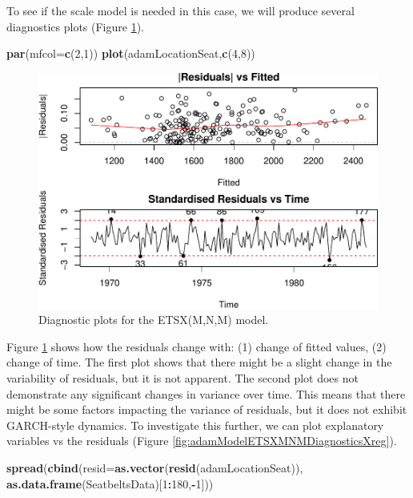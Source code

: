 \documentclass[]{book}
\newenvironment{Shaded}{\begin{snugshade}}{\end{snugshade}}
\newcommand{\DataTypeTok}[1]{\textcolor[rgb]{0.13,0.29,0.53}{#1}}
\newcommand{\DecValTok}[1]{\textcolor[rgb]{0.00,0.00,0.81}{#1}}
\newcommand{\KeywordTok}[1]{\textcolor[rgb]{0.13,0.29,0.53}{\textbf{#1}}}
\newcommand{\NormalTok}[1]{#1}
\newcommand{\OperatorTok}[1]{\textcolor[rgb]{0.81,0.36,0.00}{\textbf{#1}}}
\theoremstyle{definition}
\theoremstyle{definition}
\theoremstyle{definition}
\theoremstyle{definition}
\theoremstyle{remark}
\begin{document}
To see if the scale model is needed in this case, we will produce several diagnostics plots (Figure \ref{fig:adamModelETSXMNMDiagnostics48}).

\begin{Shaded}
\begin{Highlighting}[]
\KeywordTok{par}\NormalTok{(}\DataTypeTok{mfcol=}\KeywordTok{c}\NormalTok{(}\DecValTok{2}\NormalTok{,}\DecValTok{1}\NormalTok{))}
\KeywordTok{plot}\NormalTok{(adamLocationSeat,}\KeywordTok{c}\NormalTok{(}\DecValTok{4}\NormalTok{,}\DecValTok{8}\NormalTok{))}
\end{Highlighting}
\end{Shaded}

\begin{figure}
\centering
\includegraphics{Svetunkov--2022----ADAM_files/figure-latex/adamModelETSXMNMDiagnostics48-1.pdf}
\caption{\label{fig:adamModelETSXMNMDiagnostics48}Diagnostic plots for the ETSX(M,N,M) model.}
\end{figure}

Figure \ref{fig:adamModelETSXMNMDiagnostics48} shows how the residuals change with: (1) change of fitted values, (2) change of time. The first plot shows that there might be a slight change in the variability of residuals, but it is not apparent. The second plot does not demonstrate any significant changes in variance over time. This means that there might be some factors impacting the variance of residuals, but it does not exhibit GARCH-style dynamics. To investigate this further, we can plot explanatory variables vs the residuals (Figure \ref{fig:adamModelETSXMNMDiagnosticsXreg}).

\begin{Shaded}
\begin{Highlighting}[]
\KeywordTok{spread}\NormalTok{(}\KeywordTok{cbind}\NormalTok{(}\DataTypeTok{resid=}\KeywordTok{as.vector}\NormalTok{(}\KeywordTok{resid}\NormalTok{(adamLocationSeat)),}
             \KeywordTok{as.data.frame}\NormalTok{(SeatbeltsData)[}\DecValTok{1}\OperatorTok{:}\DecValTok{180}\NormalTok{,}\OperatorTok{-}\DecValTok{1}\NormalTok{]))}
\end{Highlighting}
\end{Shaded}
\end{document}
